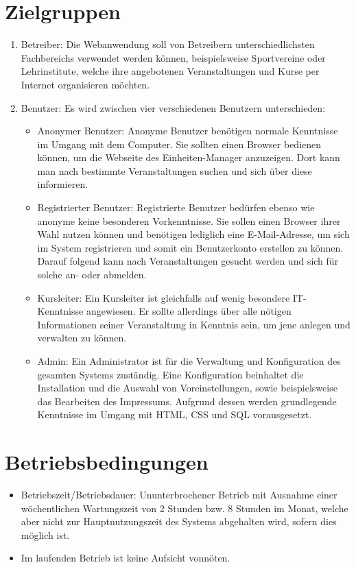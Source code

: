 \documentclass[a4paper]{scrreprt}
\begin{document}
	\section{Zielgruppen}
		 \begin{enumerate}
		 	\item Betreiber: Die Webanwendung soll von Betreibern unterschiedlichsten Fachbereichs verwendet werden können, beispielsweise Sportvereine oder Lehrinstitute, welche ihre angebotenen Veranstaltungen und Kurse per Internet organisieren möchten.
		 	\item Benutzer: Es wird zwischen vier verschiedenen Benutzern unterschieden:
		 	\begin{itemize}
		 		\item Anonymer Benutzer: Anonyme Benutzer benötigen normale Kenntnisse im Umgang mit dem Computer. Sie sollten einen Browser bedienen können, um die Webseite des \gls{Einheiten}-Manager anzuzeigen. Dort kann man nach bestimmte Veranstaltungen suchen und sich über diese informieren.
		 		\item Registrierter Benutzer: Registrierte Benutzer bedürfen ebenso wie anonyme keine besonderen Vorkenntnisse. Sie sollen einen Browser ihrer Wahl nutzen können und benötigen lediglich eine E-Mail-Adresse, um sich im System registrieren und somit ein Benutzerkonto erstellen zu können. Darauf folgend kann nach Veranstaltungen gesucht werden und sich für solche an- oder abmelden.
		 		\item Kursleiter: Ein Kursleiter ist gleichfalls auf wenig besondere IT-Kenntnisse angewiesen. Er sollte allerdings über alle nötigen Informationen seiner Veranstaltung in Kenntnis sein, um jene anlegen und verwalten zu können.
		 		\item \gls{Admin}: Ein Administrator ist für die Verwaltung und Konfiguration des gesamten Systems zuständig. Eine Konfiguration beinhaltet die Installation und die Auswahl von Voreinstellungen, sowie beispielsweise das Bearbeiten des Impressums. Aufgrund dessen werden grundlegende Kenntnisse im Umgang mit HTML, CSS und SQL vorausgesetzt.
		 	\end{itemize}	
		 \end{enumerate}  
        
    
	\section{Betriebsbedingungen}
	       \begin{itemize}
		       	\item Betriebszeit/Betriebsdauer: Ununterbrochener Betrieb mit Ausnahme einer wöchentlichen Wartungszeit von 2 Stunden bzw. 8 Stunden im Monat, welche aber nicht zur Hauptnutzungszeit des Systems abgehalten wird, sofern dies möglich ist.
		       	\item  Im laufenden Betrieb ist keine Aufsicht vonnöten.
	       \end{itemize}
	
\end{document}
